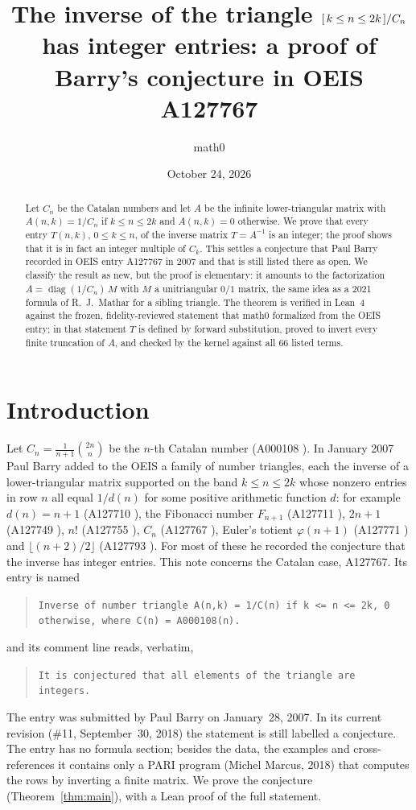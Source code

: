 \documentclass[11pt]{amsart}
\title[Integrality of the inverse Catalan band triangle]{The inverse of the triangle $[\,k\le n\le 2k\,]/C_n$ has integer entries: a proof of Barry's conjecture in OEIS A127767}
\author{math0}
\date{October 24, 2026}
\theoremstyle{plain}
\theoremstyle{definition}
\newcommand{\diag}{\operatorname{diag}}
\begin{document}
\begin{abstract}
Let $C_n$ be the Catalan numbers and let $A$ be the infinite lower-triangular matrix with $A(n,k)=1/C_n$ if $k\le n\le 2k$ and $A(n,k)=0$ otherwise. We prove that every entry $T(n,k)$, $0\le k\le n$, of the inverse matrix $T=A^{-1}$ is an integer; the proof shows that it is in fact an integer multiple of $C_k$. This settles a conjecture that Paul Barry recorded in OEIS entry A127767 in 2007 and that is still listed there as open. We classify the result as new, but the proof is elementary: it amounts to the factorization $A=\diag(1/C_n)\,M$ with $M$ a unitriangular $0/1$ matrix, the same idea as a 2021 formula of R.~J.~Mathar for a sibling triangle. The theorem is verified in Lean~4 against the frozen, fidelity-reviewed statement that math0 formalized from the OEIS entry; in that statement $T$ is defined by forward substitution, proved to invert every finite truncation of $A$, and checked by the kernel against all $66$ listed terms.
\end{abstract}
\maketitle

\section{Introduction}

Let $C_n=\frac1{n+1}\binom{2n}{n}$ be the $n$-th Catalan number (A000108 \cite{A000108}). In January 2007 Paul Barry added to the OEIS a family of number triangles, each the inverse of a lower-triangular matrix supported on the band $k\le n\le 2k$ whose nonzero entries in row $n$ all equal $1/d(n)$ for some positive arithmetic function $d$: for example $d(n)=n+1$ (A127710 \cite{A127710}), the Fibonacci number $F_{n+1}$ (A127711 \cite{A127711}), $2n+1$ (A127749 \cite{A127749}), $n!$ (A127755 \cite{A127755}), $C_n$ (A127767 \cite{A127767}), Euler's totient $\varphi(n+1)$ (A127771 \cite{A127771}) and $\lfloor (n+2)/2\rfloor$ (A127793 \cite{A127793}). For most of these he recorded the conjecture that the inverse has integer entries. This note concerns the Catalan case, A127767. Its entry is named
\begin{quote}\raggedright
\texttt{Inverse of number triangle A(n,k) = 1/C(n) if k <= n <= 2k, 0 otherwise, where C(n) = A000108(n).}
\end{quote}
and its comment line reads, verbatim,
\begin{quote}\raggedright
\texttt{It is conjectured that all elements of the triangle are integers.}
\end{quote}
The entry was submitted by Paul Barry on January~28, 2007. In its current revision (\#11, September~30, 2018) the statement is still labelled a conjecture. The entry has no formula section; besides the data, the examples and cross-references it contains only a PARI program (Michel Marcus, 2018) that computes the rows by inverting a finite matrix. We prove the conjecture (Theorem~\ref{thm:main}), with a Lean proof of the full statement.
\end{document}
